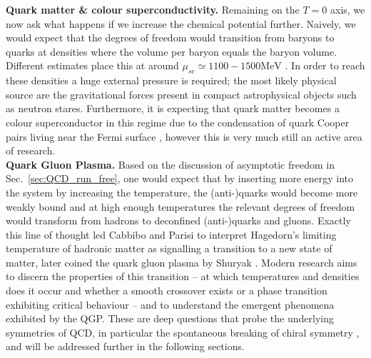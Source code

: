 \documentclass[11pt, a4paper, twoside]{book}
\begin{document}
\textbf{Quark matter \& colour superconductivity.} Remaining on the \(T=0\) axis, we now ask what happens if we increase the chemical potential further. Naively, we would expect that the degrees of freedom would transition from baryons to quarks at densities where the volume per baryon equals the baryon volume. Different estimates place this at around \(\mu_{sc}\simeq 1100-1500\mathrm{MeV}\) \cite{2001ConPh..42..209H}. In order to reach these densities a huge external pressure is required; the most likely physical source are the gravitational forces present in compact astrophysical objects such as neutron stares. Furthermore, it is expecting that quark matter becomes a colour superconductor in this regime due to the condensation of quark Cooper pairs living near the Fermi surface \cite{Alford:2001dt}, however this is very much still an active area of research. \\
\textbf{Quark Gluon Plasma.} Based on the discussion of asymptotic freedom in Sec.~\ref{sec:QCD_run_free}, one would expect that by inserting more energy into the system by increasing the temperature, the (anti-)quarks would become more weakly bound and at high enough temperatures the relevant degrees of freedom would transform from hadrons to deconfined (anti-)quarks and gluons. Exactly this line of thought led Cabbibo and Parisi \cite{Cabibbo:1975ig} to interpret Hagedorn's limiting temperature of hadronic matter \cite{Hagedorn:1965st} as signalling a transition to a new state of matter, later coined the quark gluon plasma by Shuryak \cite{Shuryak:1978ij}. Modern research aims to discern the properties of this transition -- at which temperatures and densities does it occur and whether a smooth crossover exists or a phase transition exhibiting critical behaviour -- and to understand the emergent phenomena exhibited by the QGP. These are deep questions that probe the underlying symmetries of QCD, in particular the spontaneous breaking of chiral symmetry \cite{Martinez:2013xka}, and will be addressed further in the following sections.
\end{document}
